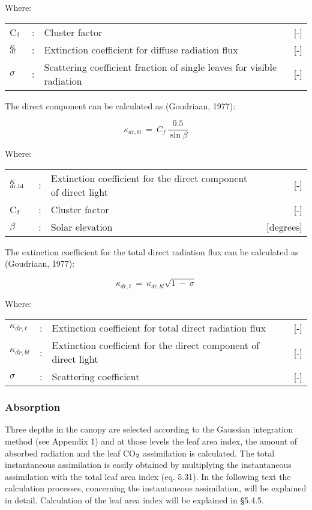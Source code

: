 Where:\\[5pt]
\begin{tabularx}{\textwidth}{llXr}
C$_{{\rm f}}$ &:& Cluster factor    &    [-]\\
$\kappa$$_{{\rm df}}$ &:& Extinction coefficient for diffuse radiation flux   &     [-]\\
$\sigma$ &:& Scattering coefficient fraction of single leaves for
   visible radiation  &      [-]\\
\end{tabularx}

The direct component can be calculated as (Goudriaan, 1977):

\begin{equation}
\kappa _{dr,bl} ~=~{ C _{f} }\,{\frac{0.5}{\sin \beta }}
\end{equation}

Where:\\[5pt]
\begin{tabularx}{\textwidth}{llXr}
$\kappa$$_{{\rm dr,bl}}$ &:& Extinction coefficient for the direct component of direct light   &     [-] \\
C$_{{\rm f}}$ &:& Cluster factor     &   [-]\\
$\beta$ &:& Solar elevation     &   [degrees]\\
\end{tabularx}

The extinction coefficient for the total direct radiation flux can be calculated as (Goudriaan, 1977):

\begin{equation}
\kappa _{dr,t} ~=~ \kappa _{dr,bl} \sqrt{1~-~\sigma }
\end{equation}

Where:\\[5pt]
\begin{tabularx}{\textwidth}{llXr}
$\kappa_{dr,t}$ &:& Extinction coefficient for total direct radiation flux   &    [-]\\
$\kappa_{dr,bl}$ &:& Extinction coefficient for the direct component of direct light  &   [-]\\
$\sigma$ &:& Scattering coefficient     &    [-]\\
\end{tabularx}

\subsubsection{Absorption}
Three depths in the canopy are selected according to the Gaussian integration method (see
Appendix 1) and at those levels the leaf area index, the amount of absorbed radiation and
the leaf CO$_{{\rm 2}}$ assimilation is calculated. The total instantaneous assimilation is easily
obtained by multiplying the instantaneous assimilation with the total leaf area index (eq.
5.31). In the following text the calculation processes, concerning the instantaneous
assimila\-tion, will be explained in detail. Calculation of the leaf area index will be
explained in \S 5.4.5.


